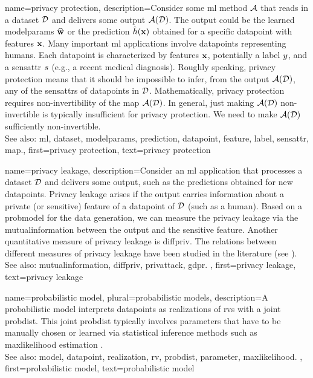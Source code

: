 {name={privacy protection},
     description={Consider some \gls{ml} method $\mathcal{A}$ that reads 
	 	in a \gls{dataset} $\mathcal{D}$ and delivers some output $\mathcal{A}(\mathcal{D})$. The output 
	 	could be the learned \glspl{modelparam} $\widehat{{\bf w}}$ or the \gls{prediction} 
	 	$\hat{h}({\bf x})$ obtained for a specific \gls{datapoint} with \glspl{feature} 
	 	${\bf x}$. Many important \gls{ml} applications involve \glspl{datapoint} 
		representing humans. Each \gls{datapoint} is characterized by \glspl{feature} ${\bf x}$, 
		potentially a \gls{label} $y$, and a \gls{sensattr} $s$ (e.g., a recent medical diagnosis). 
		Roughly speaking, privacy protection means that it should be impossible to infer, from the output $\mathcal{A}(\mathcal{D})$, 
		any of the \glspl{sensattr} of \glspl{datapoint} in $\mathcal{D}$. Mathematically, privacy protection requires non-invertibility 
		of the \gls{map} $\mathcal{A}(\mathcal{D})$. In general, just making $\mathcal{A}(\mathcal{D})$ non-invertible 
		is typically insufficient for privacy protection. We need to make $\mathcal{A}(\mathcal{D})$ sufficiently non-invertible. 
					\\ 
		See also: \gls{ml}, \gls{dataset}, \glspl{modelparam}, \gls{prediction}, \gls{datapoint}, \gls{feature}, \gls{label}, \gls{sensattr}, \gls{map}.}, 
	first={privacy protection}, 
	text={privacy protection} 
}

{name={privacy leakage},
	description={Consider an \gls{ml} application that processes a 
		\gls{dataset} $\mathcal{D}$ and delivers some output, such as the \glspl{prediction} 
		obtained for new \glspl{datapoint}. Privacy leakage arises 
		if the output carries information about a private (or sensitive) \gls{feature} of 
		a \gls{datapoint} of $\mathcal{D}$ (such as a human). Based on a \gls{probmodel} 
		for the \gls{data} generation, we can measure the privacy leakage via the \gls{mutualinformation} 
		between the output and the sensitive \gls{feature}. Another quantitative measure of privacy leakage 
		is \gls{diffpriv}. The relations between different measures of privacy leakage have been 
		studied in the literature (see \cite{InfThDiffPriv}). 
				\\ 
		See also: \gls{mutualinformation}, \gls{diffpriv}, \gls{privattack}, \gls{gdpr}. }, 
	first={privacy leakage}, 
	text={privacy leakage} 
}


{name={probabilistic model}, plural={probabilistic models},
	description={A probabilistic \gls{model} interprets \glspl{datapoint} 
		as \glspl{realization} of \glspl{rv} with a joint \gls{probdist}. This joint \gls{probdist} typically 
		involves \glspl{parameter} that have to be manually chosen or learned via statistical inference 
		methods such as \gls{maxlikelihood} estimation \cite{LC}.
					\\ 
		See also: \gls{model}, \gls{datapoint}, \gls{realization}, \gls{rv}, \gls{probdist}, \gls{parameter}, \gls{maxlikelihood}. }, 
	first={probabilistic model}, 
	text={probabilistic model} 
}


